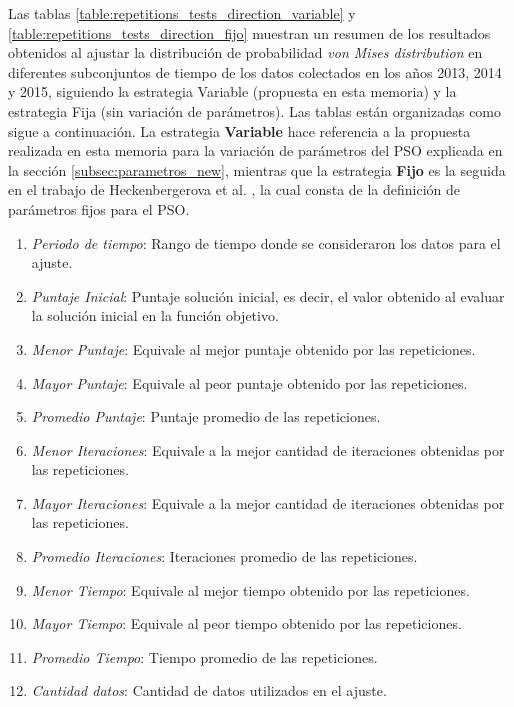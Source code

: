 Las tablas \ref{table:repetitions_tests_direction_variable} y \ref{table:repetitions_tests_direction_fijo} muestran un resumen de los resultados obtenidos al ajustar la distribución de probabilidad \emph{von Mises distribution} en diferentes subconjuntos de tiempo de los datos colectados en los años 2013, 2014 y 2015, siguiendo la estrategia Variable (propuesta en esta memoria) y la estrategia Fija (sin variación de parámetros). Las tablas están organizadas como sigue a continuación. La estrategia \textbf{Variable} hace referencia a la propuesta realizada en esta memoria para la variación de parámetros del PSO explicada en la sección \ref{subsec:parametros_new}, mientras que la estrategia \textbf{Fijo} es la seguida en el trabajo de Heckenbergerova et al. \cite{Heckenbergerova15}, la cual consta de la definición de parámetros fijos para el PSO.
\begin{enumerate}
    \item \emph{Periodo de tiempo}: Rango de tiempo donde se consideraron los datos para el ajuste.
    \item \emph{Puntaje Inicial}: Puntaje solución inicial, es decir, el valor obtenido al evaluar la solución inicial en la función objetivo.
    \item \emph{Menor Puntaje}: Equivale al mejor puntaje obtenido por las repeticiones.
    \item \emph{Mayor Puntaje}: Equivale al peor puntaje obtenido por las repeticiones.
    \item \emph{Promedio Puntaje}: Puntaje promedio de las repeticiones.
    \item \emph{Menor Iteraciones}: Equivale a la mejor cantidad de iteraciones obtenidas por las repeticiones.
    \item \emph{Mayor Iteraciones}: Equivale a la mejor cantidad de iteraciones obtenidas por las repeticiones. 
    \item \emph{Promedio Iteraciones}: Iteraciones promedio de las repeticiones. 
    \item \emph{Menor Tiempo}: Equivale al mejor tiempo obtenido por las repeticiones.
    \item \emph{Mayor Tiempo}: Equivale al peor tiempo obtenido por las repeticiones.
    \item \emph{Promedio Tiempo}: Tiempo promedio de las repeticiones.
    \item \emph{Cantidad datos}: Cantidad de datos utilizados en el ajuste.
\end{enumerate}


